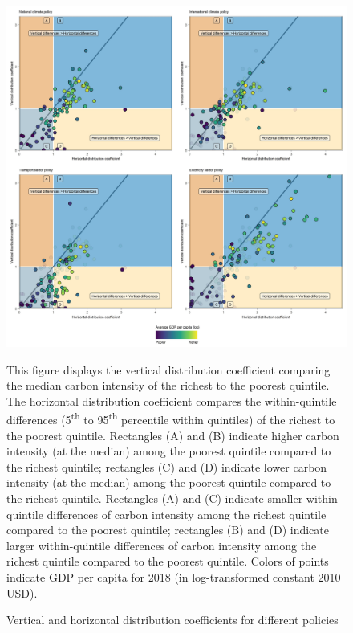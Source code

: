 \documentclass[12pt, a4paper]{article}
\newenvironment{subcaption2}
{\strut
\vspace{-5pt}
\begin{minipage}[b]{0.9\textwidth}
  \hspace*{-\parindent}
  \footnotesize}
 {\end{minipage}}
\begin{document}
\begin{figure}[ht!]
    \centering
    \caption{Vertical and horizontal distribution coefficients for different policies}
    \includegraphics[width=\textwidth]{1_Figures/Figure 2/Figure_2_2017_Policy.jpg}
    \label{fig:comparison_policies}
    \begin{subcaption2}
    This figure displays the vertical distribution coefficient comparing the median carbon intensity of the richest to the poorest quintile. The horizontal distribution coefficient compares the within-quintile differences (5\textsuperscript{th} to 95\textsuperscript{th} percentile within quintiles) of the richest to the poorest quintile. Rectangles (A) and (B) indicate higher carbon intensity (at the median) among the poorest quintile compared to the richest quintile; rectangles (C) and (D) indicate lower carbon intensity (at the median) among the poorest quintile compared to the richest quintile. Rectangles (A) and (C) indicate smaller within-quintile differences of carbon intensity among the richest quintile compared to the poorest quintile; rectangles (B) and (D) indicate larger within-quintile differences of carbon intensity among the richest quintile compared to the poorest quintile. Colors of points indicate GDP per capita for 2018 (in log-transformed constant 2010 USD).
    

\end{subcaption2}
\end{figure}
\end{document}
